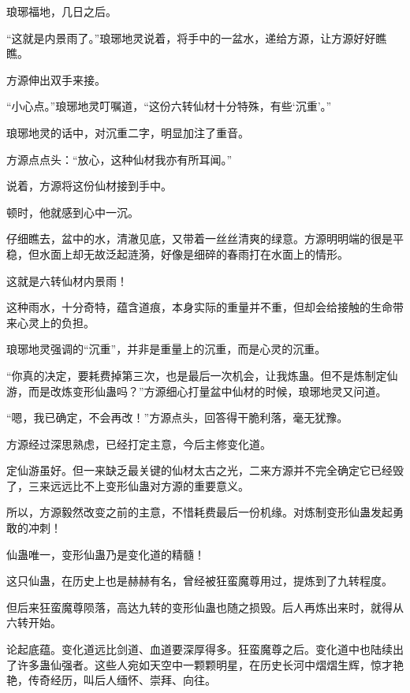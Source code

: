 
\begin{this_body}



琅琊福地，几日之后。

“这就是内景雨了。”琅琊地灵说着，将手中的一盆水，递给方源，让方源好好瞧瞧。

方源伸出双手来接。

“小心点。”琅琊地灵叮嘱道，“这份六转仙材十分特殊，有些‘沉重’。”

琅琊地灵的话中，对沉重二字，明显加注了重音。

方源点点头：“放心，这种仙材我亦有所耳闻。”

说着，方源将这份仙材接到手中。

顿时，他就感到心中一沉。

仔细瞧去，盆中的水，清澈见底，又带着一丝丝清爽的绿意。方源明明端的很是平稳，但水面上却无故泛起涟漪，好像是细碎的春雨打在水面上的情形。

这就是六转仙材内景雨！

这种雨水，十分奇特，蕴含道痕，本身实际的重量并不重，但却会给接触的生命带来心灵上的负担。

琅琊地灵强调的“沉重”，并非是重量上的沉重，而是心灵的沉重。

“你真的决定，要耗费掉第三次，也是最后一次机会，让我炼蛊。但不是炼制定仙游，而是改炼变形仙蛊吗？”方源细心打量盆中仙材的时候，琅琊地灵又问道。

“嗯，我已确定，不会再改！”方源点头，回答得干脆利落，毫无犹豫。

方源经过深思熟虑，已经打定主意，今后主修变化道。

定仙游虽好。但一来缺乏最关键的仙材太古之光，二来方源并不完全确定它已经毁了，三来远远比不上变形仙蛊对方源的重要意义。

所以，方源毅然改变之前的主意，不惜耗费最后一份机缘。对炼制变形仙蛊发起勇敢的冲刺！

仙蛊唯一，变形仙蛊乃是变化道的精髓！

这只仙蛊，在历史上也是赫赫有名，曾经被狂蛮魔尊用过，提炼到了九转程度。

但后来狂蛮魔尊陨落，高达九转的变形仙蛊也随之损毁。后人再炼出来时，就得从六转开始。

论起底蕴。变化道远比剑道、血道要深厚得多。狂蛮魔尊之后。变化道中也陆续出了许多蛊仙强者。这些人宛如天空中一颗颗明星，在历史长河中熠熠生辉，惊才艳艳，传奇经历，叫后人缅怀、崇拜、向往。


\end{this_body}
